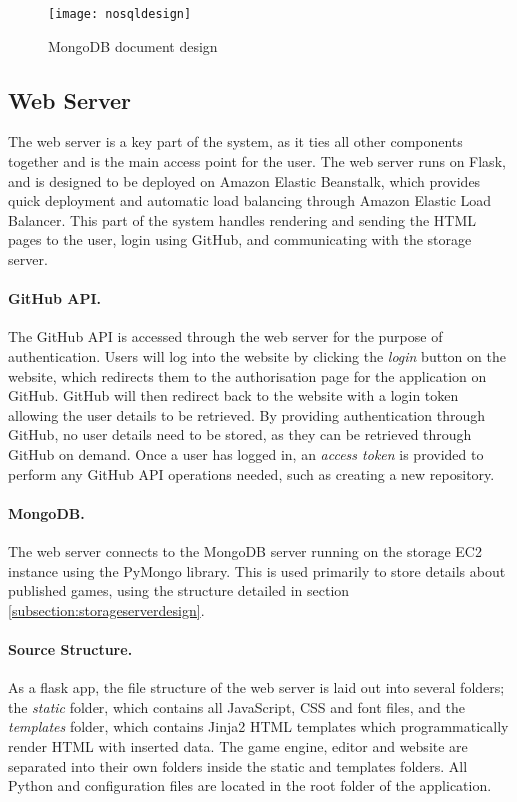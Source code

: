 	\begin{figure}[h]
		\centering
		\texttt{[image: nosqldesign]}
		\caption{MongoDB document design}
		\label{fig:nosqldesign}
	\end{figure}

	\subsection{Web Server}
	The web server is a key part of the system, as it ties all other components together and is the main access point for the user. The web server runs on Flask, and is designed to be deployed on Amazon Elastic Beanstalk, which provides quick deployment and automatic load balancing through Amazon Elastic Load Balancer. This part of the system handles rendering and sending the HTML pages to the user, login using GitHub, and communicating with the storage server.

	\paragraph{GitHub API.}
	The GitHub API is accessed through the web server for the purpose of authentication. Users will log into the website by clicking the \emph{login} button on the website, which redirects them to the authorisation page for the application on GitHub. GitHub will then redirect back to the website with a login token allowing the user details to be retrieved. By providing authentication through GitHub, no user details need to be stored, as they can be retrieved through GitHub on demand. Once a user has logged in, an \emph{access token} is provided to perform any GitHub API operations needed, such as creating a new repository.

	\paragraph{MongoDB.}
	The web server connects to the MongoDB server running on the storage EC2 instance using the PyMongo library. This is used primarily to store details about published games, using the structure detailed in section \ref{subsection:storageserverdesign}.

	\paragraph{Source Structure.}
	As a flask app, the file structure of the web server is laid out into several folders; the \emph{static} folder, which contains all JavaScript, CSS and font files, and the \emph{templates} folder, which contains Jinja2 HTML templates which programmatically render HTML with inserted data. The game engine, editor and website are separated into their own folders inside the static and templates folders. All Python and configuration files are located in the root folder of the application.

